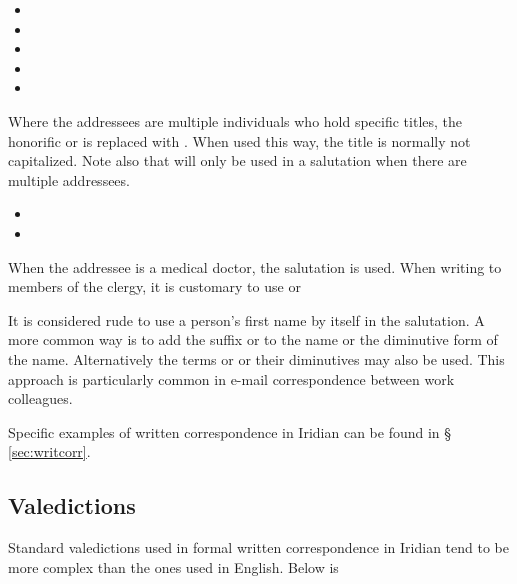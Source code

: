 \begin{itemize}[nosep]
	\item {}
	\item {}
	\item {}
	\item {}
	\item {}
\end{itemize}

Where the addressees are multiple individuals who hold specific titles, the honorific  or  is replaced with . When used this way, the title is normally not capitalized. Note also that  will only be used in a salutation when there are multiple addressees.

\begin{itemize}[nosep]
	\item {}
	\item {}
\end{itemize}

When the addressee is a medical doctor, the salutation  is used. When writing to members of the clergy, it is customary to use  or 

It is considered rude to use a person's first name by itself in the salutation. A more common way is to add the suffix  or  to the name or the diminutive form of the name. Alternatively the terms  or  or their diminutives may also be used. This approach is particularly common in e-mail correspondence between work colleagues.

Specific examples of written correspondence in Iridian can be found in \S\,\ref{sec:writcorr}.

\subsection{Valedictions}

Standard valedictions used in formal written correspondence in Iridian tend to be more complex than the ones used in English. Below is 

